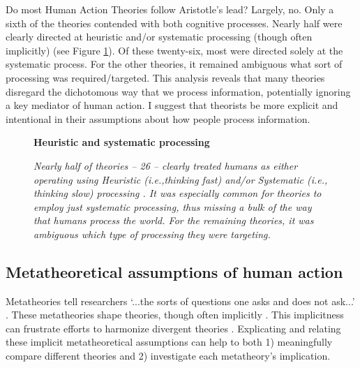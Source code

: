 \documentclass[12 pt]{article}
\begin{document}
 Do most Human Action Theories follow Aristotle's lead? Largely, no. Only a sixth of the theories contended with both cognitive processes. Nearly half were clearly directed at heuristic and/or systematic processing (though often implicitly) (see Figure \ref{fig:syst}). Of these twenty-six, most were directed solely at the systematic process. For the other theories, it remained ambiguous what sort of processing was required/targeted. This analysis reveals that many theories disregard the dichotomous way that we process information, potentially ignoring a key mediator of human action. I suggest that theorists be more explicit and intentional in their assumptions about how people process information.  
\begin{figure}
	\centering
	\textbf{Heuristic and systematic processing}  \medskip
	\caption{\textit{Nearly half of theories -- 26 -- clearly treated humans as either operating using Heuristic (i.e.,thinking fast) and/or Systematic (i.e., thinking slow) processing \parencite{Chaiken1980,Kahneman2011}. It was especially common for theories to employ just systematic processing, thus missing a bulk of the way that humans process the world. For the remaining theories, it was ambiguous which type of processing they were targeting.}}
	\label{fig:syst}
\end{figure}
\subsection{Metatheoretical assumptions of human action}
	 Metatheories tell researchers `...the sorts of questions one asks and
	does not ask...' \parencite[][p. 98]{Abrams2015}. These metatheories shape theories, though often implicitly \parencite{Fiedler2008}. This implicitness can frustrate efforts to harmonize divergent theories \parencite{Deci1976}. Explicating and relating these implicit metatheoretical assumptions can help to both 1) meaningfully compare different theories and 2) investigate each metatheory's  implication. 
	
\end{document}
